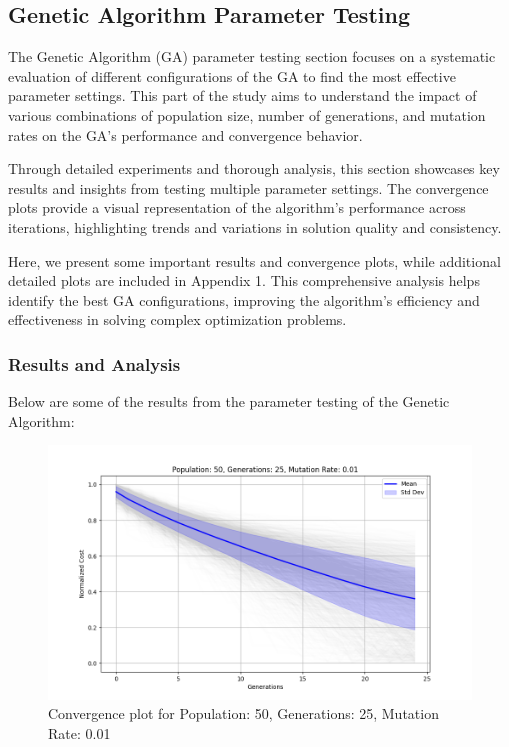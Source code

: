 \documentclass[
]{article}
\begin{document}
    \newpage

    \subsection{Genetic Algorithm Parameter Testing}
    The Genetic Algorithm (GA) parameter testing section focuses on a systematic evaluation of different configurations of the GA to find the most effective parameter settings. This part of the study aims to understand the impact of various combinations of population size, number of generations, and mutation rates on the GA's performance and convergence behavior.

    Through detailed experiments and thorough analysis, this section showcases key results and insights from testing multiple parameter settings. The convergence plots provide a visual representation of the algorithm's performance across iterations, highlighting trends and variations in solution quality and consistency.

    Here, we present some important results and convergence plots, while additional detailed plots are included in Appendix 1. This comprehensive analysis helps identify the best GA configurations, improving the algorithm's efficiency and effectiveness in solving complex optimization problems.

    \subsubsection{Results and Analysis}

    Below are some of the results from the parameter testing of the Genetic Algorithm:

    \begin{figure}[H]
        \centering
        \includegraphics[width=\textwidth]{genetic_algorithm/Population_50_Generations_25_MutationRate_0.01}
        \caption{Convergence plot for Population: 50, Generations: 25, Mutation Rate: 0.01}
        \label{fig:ga_50_25_01}
    \end{figure}
\end{document}
